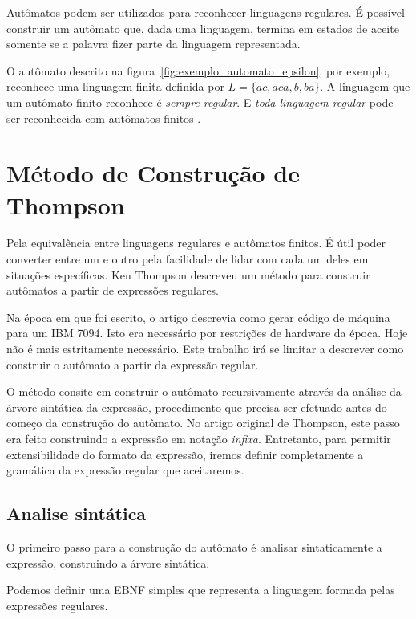\documentclass[a4paper,12pt,oneside,onecolumn]{uerj}
\begin{document}
Autômatos podem ser utilizados para reconhecer linguagens regulares. É possível construir um autômato que, dada uma linguagem, termina em estados de aceite somente se a palavra fizer parte da linguagem representada.

O autômato descrito na figura~\ref{fig:exemplo_automato_epsilon}, por exemplo, reconhece uma linguagem finita definida por $L = \{ac, aca, b, ba\}$. A linguagem que um autômato finito reconhece é \emph{sempre regular}. E \emph{toda linguagem regular} pode ser reconhecida com autômatos finitos \cite{bib:Kleene56}.

\section{Método de Construção de Thompson}

Pela equivalência entre linguagens regulares e autômatos finitos. É útil poder converter entre um e outro pela facilidade de lidar com cada um deles em situações específicas. Ken Thompson \cite{bib:Thompson68} descreveu um método para construir autômatos a partir de expressões regulares.

Na época em que foi escrito, o artigo descrevia como gerar código de máquina para um IBM 7094. Isto era necessário por restrições de hardware da época. Hoje não é mais estritamente necessário. Este trabalho irá se limitar a descrever como construir o autômato a partir da expressão regular.

O método consite em construir o autômato recursivamente através da análise da árvore sintática da expressão, procedimento que precisa ser efetuado antes do começo da construção do autômato. No artigo original de Thompson, este passo era feito construindo a expressão em notação \emph{infixa}. Entretanto, para permitir extensibilidade do formato da expressão, iremos definir completamente a gramática da expressão regular que aceitaremos.

\subsection{Analise sintática}

O primeiro passo para a construção do autômato é analisar sintaticamente a expressão, construindo a árvore sintática. 

Podemos definir uma EBNF simples que representa a linguagem formada pelas expressões regulares.
\end{document}
